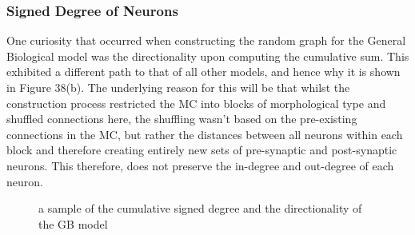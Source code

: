 \subsubsection{Signed Degree of Neurons}
One curiosity that occurred when constructing the random graph for the General Biological model was the directionality upon computing the cumulative sum. This exhibited a different path to that of all other models, and hence why it is shown in Figure 38(b). The underlying reason for this will be that whilst the construction process restricted the MC into blocks of morphological type and shuffled connections here, the shuffling wasn't based on the pre-existing connections in the MC, but rather the distances between all neurons within each block and therefore creating entirely new sets of pre-synaptic and post-synaptic neurons. This therefore, does not preserve the in-degree and out-degree of each neuron.
\begin{figure}[H]%
    \centering
    \captionsetup{justification=centering}
    \qquad
    \caption{a sample of the cumulative signed degree and the directionality of the GB model}%
    \label{fig:example}%
\end{figure}